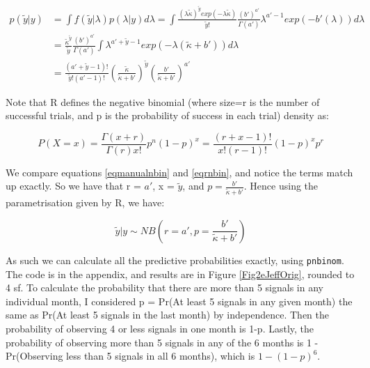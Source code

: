\documentclass{article}
\begin{document}
\begin{align}
p(\tilde{y}|y) &= \int f(\tilde{y}|\lambda)p(\lambda | y) d\lambda = \int \frac{(\lambda \tilde{\kappa})^{\tilde{y}}exp(-\lambda\tilde{\kappa})}{\tilde{y}!} \frac{(b')^{a'}}{\Gamma(a')}{\lambda^{a' -1}exp(-b'(\lambda))} d\lambda\\
&= \frac{\tilde{\kappa}^{\tilde{y}}}{\tilde{y}} \frac{(b')^{a'}}{\Gamma(a')} \int \lambda^{a' + \tilde{y}-1}exp(-\lambda(\tilde{\kappa} + b')) d\lambda \\
&= \frac{(a' + \tilde{y} -1)!}{\tilde{y}!(a'-1)!} \left(\frac{\tilde{\kappa}}{\tilde{\kappa}+b'}\right)^{\tilde{y}} \left(\frac{b'}{\tilde{\kappa} + b'}\right)^{a'} \label{eqmanualnbin}
\end{align}

Note that R defines the negative binomial (where size=r is the number of successful trials, and p is the probability of success in each trial) density as:

\vspace{-5mm}

\begin{equation}
P(X = x) = \frac{\Gamma(x+r)}{\Gamma(r)x!}p^n (1-p)^x = \frac{(r+x-1)!}{x!(r-1)!}(1-p)^x p^r \label{eqrnbin}
\end{equation}

We compare equations \eqref{eqmanualnbin} and \eqref{eqrnbin}, and notice the terms match up exactly. So we have that r = $a'$, x = $\tilde{y}$, and $p = \frac{b'}{\tilde{\kappa}  + b'}$. Hence using the parametrisation given by R, we have:

\vspace{-5mm}

\begin{equation}
\tilde{y} | y \sim NB\left(r = a', p = \frac{b'}{\tilde{\kappa} + b'}\right)
\end{equation}

As such we can calculate all the predictive probabilities exactly, using \texttt{pnbinom}. The code is in the appendix, and results are in Figure \ref{Fig2eJeffOrig}, rounded to 4 sf. To calculate the probability that there are more than 5 signals in any individual month, I considered p = Pr(At least 5 signals in any given month) the same as Pr(At least 5 signals in the last month) by independence. Then the probability of observing 4 or less signals in one month is 1-p. Lastly, the probability of observing more than 5 signals in any of the 6 months is 1 - Pr(Observing less than 5 signals in all 6 months), which is $1 - (1-p)^6$. 
\end{document}
